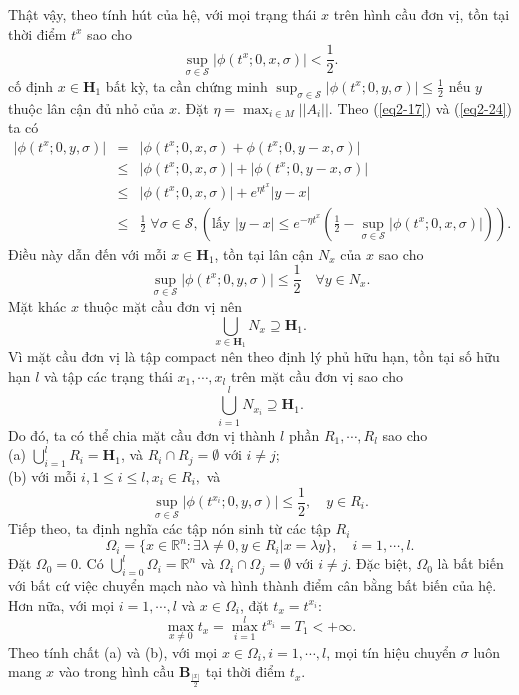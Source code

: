 \documentclass[14pt,a4paper,oneside]{report}		%
\theoremstyle{definition}
\begin{document}
Thật vậy, theo tính hút của hệ, với mọi trạng thái $x$ trên hình cầu đơn vị, tồn tại thời điểm $t^x$ sao cho
\begin{equation} \label{eq2-24}
\sup_{\sigma\in\mathcal{S}}|\phi(t^x;0,x,\sigma)|<\frac{1}{2}.
\end{equation}
cố định $x\in\mathbf{H}_1$ bất kỳ, ta cần chứng minh $\sup_{\sigma\in\mathcal{S}}|\phi(t^x;0,y,\sigma)|\leq\frac{1}{2}$ nếu $y$ thuộc lân cận đủ nhỏ của $x$. Đặt $\eta = \max_{i\in M}||A_i||$. Theo (\ref{eq2-17}) và (\ref{eq2-24}) ta có
$$
\begin{array}{lcl}|\phi (t^x;0,y,\sigma)|&
=& |\phi(t^x;0,x,\sigma) + \phi(t^x;0,y-x,\sigma)|\\
&\leq & |\phi(t^x;0,x,\sigma)| + |\phi(t^x;0,y-x,\sigma)|\\
&\leq &|\phi(t^x;0,x,\sigma)| + e^{\eta t^x}|y-x|\\
&\leq &\frac{1}{2}\;\forall\sigma\in\mathcal{S}, (\text{lấy }|y-x|\leq e^{-\eta t^x}(\frac{1}{2}-\sup_{\sigma\in\mathcal{S}}|\phi(t^x;0,x,\sigma)|)).
\end{array}
$$
Điều này dẫn đến với mỗi $x\in\mathbf{H}_1$, tồn tại lân cận $N_x$ của $x$ sao cho
$$\sup_{\sigma\in\mathcal{S}}|\phi (t^x;0,y,\sigma)| \leq\frac{1}{2}\quad\forall y\in N_x.$$
Mặt khác $x$ thuộc mặt cầu đơn vị nên
$$\bigcup_{x\in\mathbf{H}_1}N_x \supseteq \mathbf{H}_1.$$
Vì mặt cầu đơn vị là tập compact nên theo định lý phủ hữu hạn, tồn tại số hữu hạn $l$ và tập các trạng thái $x_1,\cdots,x_l$ trên mặt cầu đơn vị sao cho 
$$\bigcup_{i=1}^lN_{x_i} \supseteq \mathbf{H}_1.$$
Do đó, ta có thể chia mặt cầu đơn vị thành $l$ phần $R_1,\cdots,R_l$ sao cho\\
(a) $\bigcup_{i=1}^lR_i=\mathbf{H}_1$, và $R_i\cap R_j=\emptyset$ với $i\neq j$;\\
(b) với mỗi $i, 1\leq i\leq l,x_i\in R_i,$ và
$$\sup_{\sigma\in\mathcal{S}}|\phi(t^{x_i};0,y,\sigma)|\leq\frac{1}{2}, \quad y\in R_i.$$
Tiếp theo, ta định nghĩa các tập nón sinh từ các tập $R_i$
$$\Omega_i = \{x\in\mathbb{R}^n:\exists\lambda\neq 0, y\in R_i | x=\lambda y\}, \quad i=1,\cdots,l.$$
Đặt $\Omega_0={0}$. Có $\bigcup_{i=0}^l\Omega_i=\mathbb{R}^n$ và $\Omega_i \cap \Omega_j = \emptyset$ với $i\neq j$. Đặc biệt, $\Omega_0$ là bất biến với bất cứ việc chuyển mạch nào và hình thành điểm cân bằng bất biến của hệ.\\
Hơn nữa, với mọi $i=1,\cdots,l$ và $x\in\Omega_i$, đặt $t_x = t^{x_i}$:
\begin{equation} \label{eq2-25}
\max_{x\neq 0}t_x = \max_{i=1}^lt^{x_i}=T_1 <+\infty.
\end{equation}
Theo tính chất (a) và (b), với mọi $x\in\Omega_i, i=1,\cdots,l$, mọi tín hiệu chuyển $\sigma$ luôn mang $x$ vào trong hình cầu $\mathbf{B}_{\frac{|x|}{2}}$ tại thời điểm $t_x$.\\
\end{document}
